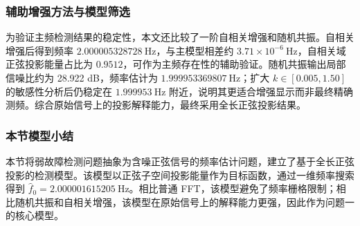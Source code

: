 \subsubsection{辅助增强方法与模型筛选}


为验证主频检测结果的稳定性，本文还比较了一阶自相关增强和随机共振。自相关增强后得到频率 \(2.000005328728\ \mathrm{Hz}\)，与主模型相差约 \(3.71\times10^{-6}\ \mathrm{Hz}\)，自相关域正弦投影能量占比为 \(0.9512\)，可作为主频存在性的辅助验证。随机共振输出局部信噪比约为 28.922 dB，频率估计为 \(1.999953369807\ \mathrm{Hz}\)；扩大 \(k\in[0.005,1.50]\) 的敏感性分析后仍稳定在 \(1.999953\ \mathrm{Hz}\) 附近，说明其更适合增强显示而非最终精确测频。综合原始信号上的投影解释能力，最终采用全长正弦投影结果。


\subsubsection{本节模型小结}


本节将弱故障检测问题抽象为含噪正弦信号的频率估计问题，建立了基于全长正弦投影的检测模型。该模型以正弦子空间投影能量作为目标函数，通过一维频率搜索得到 \(\hat f_0=2.000001615205\ \mathrm{Hz}\)。相比普通 FFT，该模型避免了频率栅格限制；相比随机共振和自相关增强，该模型在原始信号上的解释能力更强，因此作为问题一的核心模型。
